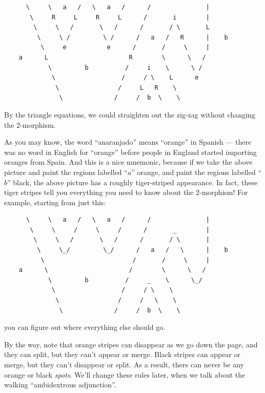 \documentclass{article}
\begin{document}
\begin{verbatim}
      \     \   a   /   \   a   /      /               |
       \     R     L     R     L      /       i        |
        \     \   /       \   /      /       / \       L
         \     \ /         \ /      /   a   /   R      |    b
          \     e           e      /       /     \     |
    a      L                      R        \      \   / 
            \         b          /     i    \      \ / 
             \                  /     / \    L      e
              \                /     L   R    \       
               \              /     /  b  \    \  
\end{verbatim}

By the triangle equations, we could straighten out the zig-zag without
changing the \(2\)-morphism.

As you may know, the word ``anaranjado'' means ``orange'' in Spanish ---
there was no word in English for ``orange'' before people in England
started importing oranges from Spain. And this is a nice mnemonic,
because if we take the above picture and paint the regions labelled
``\(a\)'' orange, and paint the regions labelled ``\(b\)'' black, the
above picture has a roughly tiger-striped appearance. In fact, these
tiger stripes tell you everything you need to know about the
\(2\)-morphism! For example, starting from just this:

\begin{verbatim}
      \     \   a   /   \   a   /      /               |
       \     \     /     \     /      /       _        |
        \     \   /       \   /      /       / \       |
         \     \_/         \_/      /   a   /   \      |    b
          \                        /       /     \     |
    a      \                      /        \      \   / 
            \         b          /     _    \      \_/ 
             \                  /     / \    \      
              \                /     /   \    \       
               \              /     /  b  \    \  
\end{verbatim}

you can figure out where everything else should go.

By the way, note that orange stripes can disappear as we go down the
page, and they can split, but they can't appear or merge. Black stripes
can appear or merge, but they can't disappear or split. As a result,
there can never be any orange or black \emph{spots}. We'll change these
rules later, when we talk about the walking ``ambidextrous adjunction''.
\end{document}
